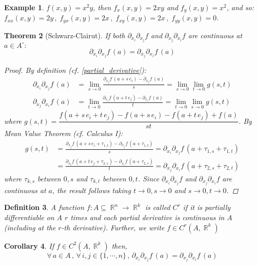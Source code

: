 \documentclass[12pt]{article}
\newcommand{\Forall}[1]{\forall\,{#1}\,,\,}
\DeclareMathOperator{\R}{\mathbb{R}}
\newtheorem{theorem}{Theorem}[subsection]
\newtheorem{definition}[theorem]{Definition}
\newtheorem{corollary}[theorem]{Corollary}
\newtheorem{example}[theorem]{Example}
\begin{document}
\begin{example}
  $f(x,y)=x^2y$, then $f_x(x,y)=2xy$ and $f_y(x,y)=x^2$, and so: $f_{xx}(x,y)=2y\,,\;f_{yx}(x,y)=2x\,,\;f_{xy}(x,y)=2x\,,\;f_{yy}(x,y)=0$.
\end{example}

\begin{theorem}[Schwarz-Clairut]
  \label{schwarz_thm}
  If both $\displaystyle\partial_{x_i}\partial_{x_j} f$ and $\displaystyle\partial_{x_j}\partial_{x_i} f$ are continuous at $a\in A^\circ:$ $$\partial_{x_i}\partial_{x_j} f\,(a)=\partial_{x_j}\partial_{x_i} f\,(a)$$
  \begin{proof}
    By definition (cf. \ref{partial_derivative}):
    \begin{align*}
      \partial_{x_i}\partial_{x_j} f\,(a)&=\lim_{s\to 0}\frac{\partial_{x_j} f\,(a+s\,e_i)-\partial_{x_j} f\,(a)}{s}=\lim_{s\to 0}\lim_{t\to 0}g(s,t)\\
      \partial_{x_j}\partial_{x_i} f\,(a)&=\lim_{t\to 0}\frac{\partial_{x_i} f\,(a+t\,e_j)-\partial_{x_i} f\,(a)}{t}=\lim_{t\to 0}\lim_{s\to 0}g(s,t)
    \end{align*}
    where $g(s,t)=\dfrac{f(a+s\,e_i+t\,e_j)-f(a+s\,e_i)-f(a+t\,e_j)+f(a)}{st}$. By Mean Value Theorem (cf. Calculus I): 
    \begin{align*}
      g(s,t)&=\frac{\partial_{x_j} f\,(a+s\,e_i+\tau_{1,t})-\partial_{x_j} f\,(a+\tau_{1,t})}{s}=\partial_{x_i}\partial_{x_j} f\,(a+\tau_{1,s}+\tau_{1,t})\\
      &=\frac{\partial_{x_i} f\,(a+t\,e_j+\tau_{2,s})-\partial_{x_i} f\,(a+\tau_{2,s})}{t}=\partial_{x_j}\partial_{x_i} f\,(a+\tau_{2,s}+\tau_{2,t})
    \end{align*}
    where $\tau_{k,s}$ between $0,s$ and $\tau_{k,t}$ between $0,t$. Since $\displaystyle\partial_{x_i}\partial_{x_j} f$ and $\displaystyle\partial_{x_j}\partial_{x_i} f$ are continuous at $a$, the result follows taking $t\to 0,s\to 0$ and $s\to 0,t\to 0$.
  \end{proof}
\end{theorem}

\begin{definition}
  A function $f:A\subseteq \R^n\to\R^k$ is called $C^r$ if it is partially differentiable on $A$ $r$ times and each partial derivative is continuous in $A$ (including at the $r$-th derivative). Further, we write $f\in C^r(A,\R^k)$
\end{definition}

\begin{corollary}
  If $f\in C^2(A,\R^k)$ then, $$\Forall{a\in A}\Forall{i,j\in\{1,\cdots,n\}}\partial_{x_i}\partial_{x_j} f\,(a)=\partial_{x_j}\partial_{x_i} f\,(a)$$
\end{corollary}
  
\end{document}
